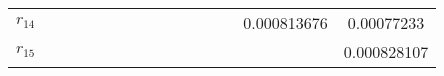 \documentclass[a4paper]{article}
\begin{document}
\begin{CJK*}{GBK}{song}
\begin{center}
\begin{table*}[!htbp]
{\begin{threeparttable}[!htbp]
\begin{tabular}{ccccc ccccc ccccc}
$r_{14}$	&		&		&		&		&		&		&		&		&		&		&		&		&	0.000813676	&	0.00077233	\\
$r_{15}$	&		&		&		&		&		&		&		&		&		&		&		&		&		&	0.000828107	\\
 \bottomrule
\end{tabular}
\end{threeparttable}}%
\end{table*}
\end{center}

\begin{center}
\begin{table*}[!htbp]
\end{table*}
\end{center}
\end{CJK*}
\end{document}
